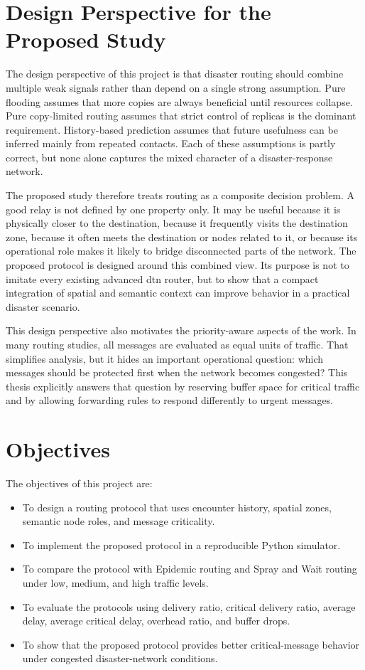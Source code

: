 \section{Design Perspective for the Proposed Study}
The design perspective of this project is that disaster routing should combine multiple weak signals rather than depend on a single strong assumption. Pure flooding assumes that more copies are always beneficial until resources collapse. Pure copy-limited routing assumes that strict control of replicas is the dominant requirement. History-based prediction assumes that future usefulness can be inferred mainly from repeated contacts. Each of these assumptions is partly correct, but none alone captures the mixed character of a disaster-response network.

The proposed study therefore treats routing as a composite decision problem. A good relay is not defined by one property only. It may be useful because it is physically closer to the destination, because it frequently visits the destination zone, because it often meets the destination or nodes related to it, or because its operational role makes it likely to bridge disconnected parts of the network. The proposed protocol is designed around this combined view. Its purpose is not to imitate every existing advanced \ac{dtn} router, but to show that a compact integration of spatial and semantic context can improve behavior in a practical disaster scenario.

This design perspective also motivates the priority-aware aspects of the work. In many routing studies, all messages are evaluated as equal units of traffic. That simplifies analysis, but it hides an important operational question: which messages should be protected first when the network becomes congested? This thesis explicitly answers that question by reserving buffer space for critical traffic and by allowing forwarding rules to respond differently to urgent messages.

\section{Objectives}
The objectives of this project are:

\begin{itemize}
	\item To design a routing protocol that uses encounter history, spatial zones, semantic node roles, and message criticality.
	\item To implement the proposed protocol in a reproducible Python simulator.
	\item To compare the protocol with Epidemic routing and Spray and Wait routing under low, medium, and high traffic levels.
	\item To evaluate the protocols using delivery ratio, critical delivery ratio, average delay, average critical delay, overhead ratio, and buffer drops.
	\item To show that the proposed protocol provides better critical-message behavior under congested disaster-network conditions.
\end{itemize}

